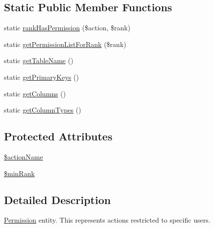 \subsection*{Static Public Member Functions}
\begin{DoxyCompactItemize}
\item 
static \hyperlink{classPermission_aaa1ea30e31b0e60dd30231e43b0af3aa}{rankHasPermission} (\$action, \$rank)
\item 
static \hyperlink{classPermission_abcffffde78f2430545cdbe63369928b9}{getPermissionListForRank} (\$rank)
\item 
static \hyperlink{classPermission_a9a6694ebca8793f08c3f3388c27e0645}{getTableName} ()
\item 
static \hyperlink{classPermission_a378dfdccb2df0e6d2b7bb059cd918873}{getPrimaryKeys} ()
\item 
static \hyperlink{classPermission_ac2a9a31fc731c58daa3b0b9385ec03fb}{getColumns} ()
\item 
static \hyperlink{classPermission_a0040cda21f71bbcdf478c9e8f1996d6d}{getColumnTypes} ()
\end{DoxyCompactItemize}
\subsection*{Protected Attributes}
\begin{DoxyCompactItemize}
\item 
\hyperlink{classPermission_ae5d62bba6b0bf9df502550081ce35db4}{\$actionName}
\item 
\hyperlink{classPermission_a21d0591b1aeff82d569b033fad2f521c}{\$minRank}
\end{DoxyCompactItemize}


\subsection{Detailed Description}
\hyperlink{classPermission}{Permission} entity. This represents actions restricted to specific users. 

